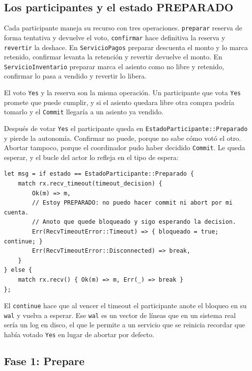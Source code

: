 \subsection{Los participantes y el estado PREPARADO}

Cada participante maneja su recurso con tres operaciones.
\texttt{preparar} reserva de forma tentativa y devuelve el voto,
\texttt{confirmar} hace definitiva la reserva y \texttt{revertir} la deshace.
En \texttt{ServicioPagos} preparar descuenta el monto y lo marca retenido,
confirmar levanta la retención y revertir devuelve el monto. En
\texttt{ServicioInventario} preparar marca el asiento como no libre y
retenido, confirmar lo pasa a vendido y revertir lo libera.

El voto \texttt{Yes} y la reserva son la misma operación. Un participante que
vota \texttt{Yes} promete que puede cumplir, y si el asiento quedara libre
otra compra podría tomarlo y el \texttt{Commit} llegaría a un asiento ya
vendido.

Después de votar \texttt{Yes} el participante queda en
\texttt{EstadoParticipante::Preparado} y pierde la autonomía. Confirmar no
puede, porque no sabe cómo votó el otro. Abortar tampoco, porque el
coordinador pudo haber decidido \texttt{Commit}. Le queda esperar, y el bucle
del actor lo refleja en el tipo de espera:

\begin{lstlisting}
let msg = if estado == EstadoParticipante::Preparado {
    match rx.recv_timeout(timeout_decision) {
        Ok(m) => m,
        // Estoy PREPARADO: no puedo hacer commit ni abort por mi cuenta.
        // Anoto que quede bloqueado y sigo esperando la decision.
        Err(RecvTimeoutError::Timeout) => { bloqueado = true; continue; }
        Err(RecvTimeoutError::Disconnected) => break,
    }
} else {
    match rx.recv() { Ok(m) => m, Err(_) => break }
};
\end{lstlisting}

El \texttt{continue} hace que al vencer el timeout el participante anote el
bloqueo en su \texttt{wal} y vuelva a esperar. Ese \texttt{wal} es
un vector de líneas que en un sistema real sería un log en disco, el que le
permite a un servicio que se reinicia recordar que había votado \texttt{Yes}
en lugar de abortar por defecto.

\subsection{Fase 1: Prepare}

